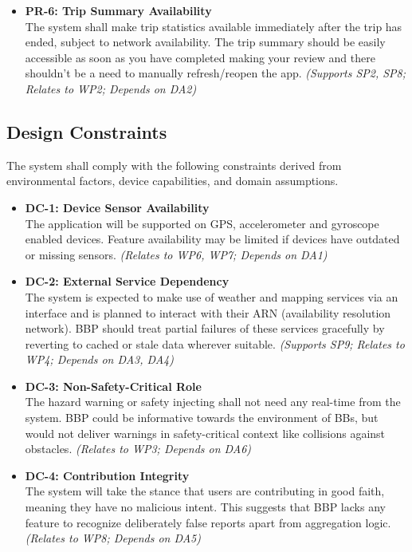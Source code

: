 \begin{itemize}
    \item \textbf{PR-6: Trip Summary Availability}
    \label{req:PR-6}\\
    The system shall make trip statistics available immediately after the trip has ended, subject to network availability. The trip summary should be easily accessible as soon as you have completed making your review and there shouldn't be a need to manually refresh/reopen the app.
    \textit{(Supports SP2, SP8; Relates to WP2; Depends on DA2)}

\end{itemize}


\subsection{Design Constraints}
\label{sec:design_constraints}

The system shall comply with the following constraints derived from environmental factors, device capabilities, and domain assumptions.

\begin{itemize}

    \item \textbf{DC-1: Device Sensor Availability}
    \label{req:DC-1}\\
    The application will be supported on GPS, accelerometer and gyroscope enabled devices. Feature availability may be limited if devices have outdated or missing sensors.
    \textit{(Relates to WP6, WP7; Depends on DA1)}

    \item \textbf{DC-2: External Service Dependency}
    \label{req:DC-2}\\
    The system is expected to make use of weather and mapping services via an interface and is planned to interact with their ARN (availability resolution network). BBP should treat partial failures of these services gracefully by reverting to cached or stale data wherever suitable.
    \textit{(Supports SP9; Relates to WP4; Depends on DA3, DA4)}

    \item \textbf{DC-3: Non-Safety-Critical Role}
    \label{req:DC-3}\\
    The hazard warning or safety injecting shall not need any real-time from the system. BBP could be informative towards the environment of BBs, but would not deliver warnings in safety-critical context like collisions against obstacles. 
    \textit{(Relates to WP3; Depends on DA6)}

    \item \textbf{DC-4: Contribution Integrity}
    \label{req:DC-4}\\
    The system will take the stance that users are contributing in good faith, meaning they have no malicious intent. This suggests that BBP lacks any feature to recognize deliberately false reports apart from aggregation logic.
    \textit{(Relates to WP8; Depends on DA5)}

\end{itemize}

